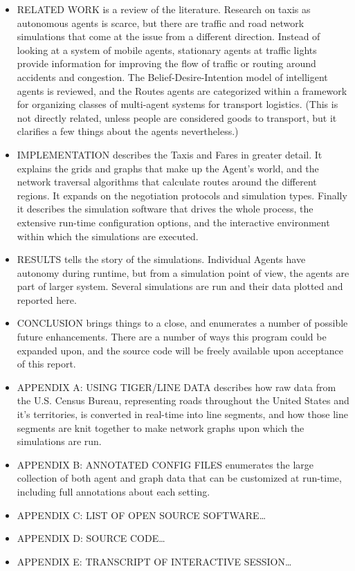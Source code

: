 \documentclass[11pt,letterpaper,onecolumn,twoside,openright,draft]{report}
\begin{document}
\begin{itemize}
  \item{RELATED WORK is a review of the literature.
    Research on taxis as autonomous agents is scarce, but there are traffic and road network simulations that come at the issue from a different direction.
    Instead of looking at a system of mobile agents, stationary agents at traffic lights provide information for improving the flow of traffic or routing around accidents and congestion.
    The Belief-Desire-Intention model of intelligent agents is reviewed, and the Routes agents are categorized within a framework for organizing classes of multi-agent systems for transport logistics.
    (This is not directly related, unless people are considered goods to transport, but it clarifies a few things about the agents nevertheless.)}
  \item{IMPLEMENTATION describes the Taxis and Fares in \linebreak greater detail.
    It explains the grids and graphs that make up the Agent's world, and the network traversal algorithms that calculate routes around the different regions.
    It expands on the negotiation protocols and simulation types.
    Finally it describes the simulation software that drives the whole process, the extensive run-time configuration options, and the interactive environment within which the simulations are executed.}
  \item{RESULTS tells the story of the simulations.
    Individual Agents have autonomy during runtime, but from a simulation point of view, the agents are part of larger system.
    Several simulations are run and their data plotted and reported here.}
  \item{CONCLUSION brings things to a close, and enumerates a number of possible future enhancements.
    There are a number of ways this program could be expanded upon, and the source code will be freely available upon acceptance of this report.}
  \item{APPENDIX A: USING TIGER/LINE DATA describes how raw data from the U.S. Census Bureau, representing roads throughout the United States and it's territories, is converted in real-time into line segments, and how those line segments are knit together to make network graphs upon which the simulations are run.}
  \item{APPENDIX B: ANNOTATED CONFIG FILES enumerates the large collection of both agent and graph data that can be customized at run-time, including full annotations about each setting.}
  \item{APPENDIX C: LIST OF OPEN SOURCE SOFTWARE\ldots}
  \item{APPENDIX D: SOURCE CODE\ldots}
  \item{APPENDIX E: TRANSCRIPT OF INTERACTIVE SESSION\ldots}
\end{itemize}
\end{document}
